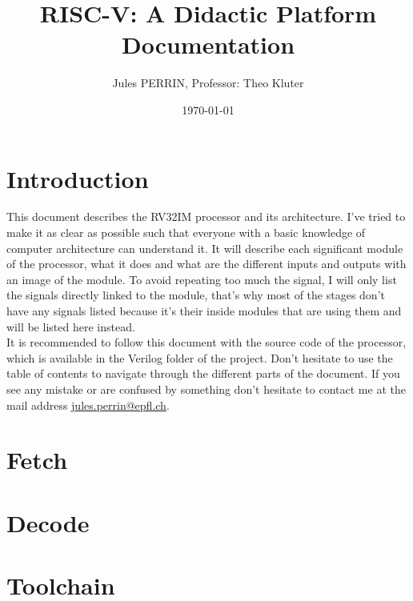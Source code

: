 \documentclass[12pt]{article}
\title{RISC-V: A Didactic Platform \\
\large Documentation}
\author{Jules PERRIN, Professor: Theo Kluter}
\date{\today}
\begin{document}
\maketitle
\tableofcontents

\section{Introduction}
This document describes the RV32IM processor and its architecture. I've tried to make it as clear 
as possible such that everyone with a basic knowledge of computer architecture can understand it.
It will describe each significant module of the processor, what it does and what are the different
inputs and outputs with an image of the module. To avoid repeating too much the signal, I will only list 
the signals directly linked to the module, that's why most of the stages don't have any signals listed because 
it's their inside modules that are using them and will be listed here instead. \\

It is recommended to follow this document with the source code of the processor, which is available
in the Verilog folder of the project.
Don't hesitate to use the table of contents to navigate through the different parts of the document.
If you see any mistake or are confused by something don't hesitate to contact me at the mail address
\href{mailto:jules.perrin@epfl.ch}{jules.perrin@epfl.ch}.

\section{Fetch}




\section{Decode}





\section{Toolchain}

\end{document}
